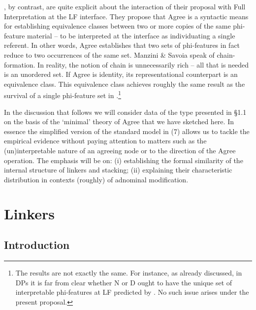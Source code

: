\documentclass[output=paper]{langsci/langscibook}
\begin{document}
   \citet{Manzini2007}, by contrast, are quite explicit about the interaction of their proposal with Full Interpretation at the LF interface. They propose that Agree is a syntactic means for establishing equivalence classes between two or more copies of the same phi-feature material – to be interpreted at the interface as individuating a single referent. In other words, Agree establishes that two sets of phi-features in fact reduce to two occurrences of the same set. Manzini \& Savoia speak of chain-formation. In reality, the notion of chain is unnecessarily rich – all that is needed is an unordered set. If Agree is identity, its representational counterpart is an equivalence class. This equivalence class achieves roughly the same result as the survival of a single phi-feature set in \citet{Chomsky2000,Chomsky2001Derivation}.\footnote{The results are not exactly the same. For instance, {as already discussed, in DPs it is far from clear whether N or D ought to have the unique set of interpretable phi-featu}{r}{es at LF}{ predicted by \citet{Chomsky2001Derivation}. No such issue arises under the present proposal.}}

  In the discussion that follows we will consider data of the type presented in §1.1 on the basis of the ‘minimal’ theory of Agree that we have sketched here. In essence the simplified version of the standard model in (7) allows us to tackle the empirical evidence without paying attention to matters such as the (un)interpretable nature of an agreeing node or to the direction of the Agree operation. The emphasis will be on: (i) establishing the formal similarity of the internal structure of linkers and stacking; (ii) explaining their characteristic distribution in contexts (roughly) of adnominal modification.   

\section{Linkers} %

\subsection{Introduction}%
\end{document}
